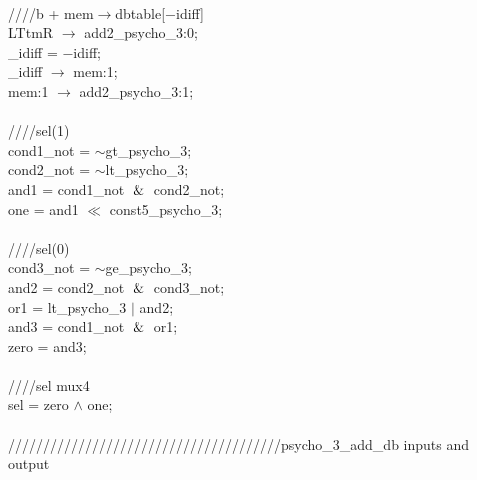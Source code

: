 {   \\
   \hspace*{2em}////b + mem$\rightarrow$dbtable[$-$idiff] \\
   \hspace*{2em}LTtmR $\rightarrow$ add2\_psycho\_3:0; \\
   \hspace*{2em}\_idiff = $-$idiff; \\
   \hspace*{2em}\_idiff $\rightarrow$ mem:1; \\
   \hspace*{2em}mem:1 $\rightarrow$ add2\_psycho\_3:1; \\
   \\
   \hspace*{2em}////sel(1) \\
   \hspace*{2em}cond1\_not = $\sim$gt\_psycho\_3; \\
   \hspace*{2em}cond2\_not = $\sim$lt\_psycho\_3; \\
   \hspace*{2em}and1 = cond1\_not $\And$ cond2\_not; \\
   \hspace*{2em}one = and1 $\ll$ const5\_psycho\_3; \\
   \\
   \hspace*{2em}////sel(0) \\
   \hspace*{2em}cond3\_not = $\sim$ge\_psycho\_3; \\
   \hspace*{2em}and2 = cond2\_not $\And$ cond3\_not; \\
   \hspace*{2em}or1 = lt\_psycho\_3 $\vert$ and2; \\
   \hspace*{2em}and3 = cond1\_not $\And$ or1; \\
   \hspace*{2em}zero = and3; \\
   \\
   \hspace*{2em}////sel mux4 \\
   \hspace*{2em}sel = zero $\wedge$ one; \\
   \\
   \hspace*{2em}///////////////////////////////////////psycho\_3\_add\_db inputs and output \\
}
